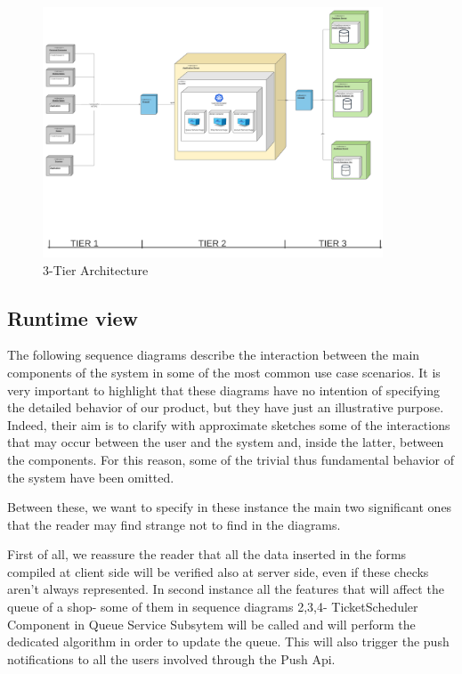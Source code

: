 \begin{figure}[h!]
    \centering
    \includegraphics[width=0.9\textwidth]{Images/Deployementview(2).png}
    \caption{\label{fig:Deployement View}{3-Tier Architecture}}
\end{figure}

\FloatBarrier

\subsection{Runtime view}
\label{subsect:runtimeview}

The following sequence diagrams describe the interaction between the main components of the system in some of the most common use case scenarios. It is very important to highlight that these diagrams have no intention of specifying the detailed behavior of our product, but they have just an illustrative purpose. Indeed, their aim is to clarify with approximate sketches some of the interactions that may occur between the user and the system and, inside the latter, between the components.
For this reason, some of the trivial thus fundamental behavior of the system have been omitted. 

Between these, we want to specify in these instance the main two significant ones that the reader may find strange not to find in the diagrams.

First of all, we reassure the reader that all the data inserted in the forms compiled at client side will be verified also at server side, even if these checks aren't always represented.\newline
In second instance all the features that will affect the queue of a shop- some of them in sequence diagrams 2,3,4- TicketScheduler Component in Queue Service Subsytem will be called and will perform the dedicated algorithm in order to update the queue. This will also trigger the push notifications to all the users involved through the Push Api.

